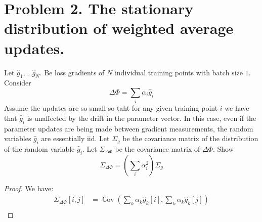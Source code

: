 \documentclass{amsart}
\newcommand{\Cov}[1]{\operatorname{\mathbb{C}ov}\left(#1\right)}
\theoremstyle{definition}
\begin{document}
\section*{Problem 2. The stationary distribution of weighted average updates. }
Let $\hat{g}_1, \ldots \hat{g}_N$. Be loss gradients of $N$ individual training points with batch size $1$. 
Consider 
\[
\Delta \Phi = \sum_{i} \alpha_i \hat{g}_i
\]
Assume the updates are so small so taht for any given training point $i$ we have that $\hat{g}_i$ is unaffected by the drift in the parameter vector.
In this case, even if the parameter updates are being made between gradient measurements, the random variables $\hat{g}_i$ are essentially iid. 
Let $\Sigma_g$ be the covariance matrix of the distribution of the random variable $\hat{g}_i$. 
Let $\Sigma_{\Delta \Phi}$ be the covariance matrix of $\Delta \Phi$. 
Show
\[
\Sigma_{\Delta\Phi} = \left(
\sum_{i} \alpha_i^2
\right) \Sigma_g
\]
\begin{proof}
  We have:
  \begin{align*}
    \Sigma_{\Delta\Phi}[i,j] &= \Cov{\sum_{k} \alpha_k \hat{g}_k[i], \sum_{k} \alpha_k \hat{g}_k[j]} \\
  \end{align*}
\end{proof}
\end{document}
